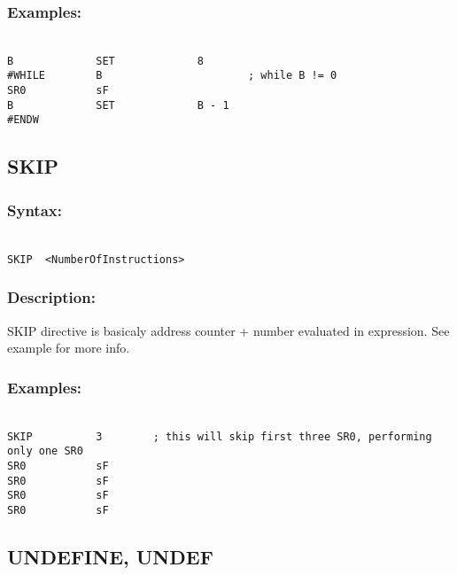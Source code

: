         \subsubsection{Examples:}
        {
                ~\\
                \usecodefont
                \verb'B             SET             8'\\
                \verb'#WHILE        B                       ; while B != 0'\\
                \verb'SR0           sF'\\
                \verb'B             SET             B - 1'\\
                \verb'#ENDW'
        }

    \subsection{SKIP}
        \subsubsection{Syntax:}
        {
            ~\\
            \usecodefont        
            \verb'SKIP  <NumberOfInstructions>'
        }
        \subsubsection{Description:}
            SKIP directive is basicaly address counter + number evaluated in expression. See example for more info.

        \subsubsection{Examples:}
        {
            ~\\
            \usecodefont
            \verb'SKIP          3        ; this will skip first three SR0, performing only one SR0'\\
            \verb'SR0           sF'\\
            \verb'SR0           sF'\\
            \verb'SR0           sF'\\
            \verb'SR0           sF'\\
        }

    \subsection{UNDEFINE, UNDEF}

